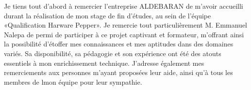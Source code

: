 Je tiens tout d’abord à remercier l’entreprise ALDEBARAN de m’avoir accueilli durant la réalisation de mon stage de fin d'études, au sein de l'équipe «Qualification Harware Pepper».
Je remercie tout particulièrement M. Emmanuel Nalepa de permi de participer à ce projet captivant et formateur, m’offrant ainsi la possibilité d'étoffer mes connaissances et mes aptitudes dans des domaines variés. Sa disponibilité, sa pédagogie et son expérience ont été des atouts essentiels à mon enrichissement technique.
J’adresse également mes remerciements aux personnes m'ayant proposées leur aide, ainsi qu'à tous les membres de lmon équipe  pour leur sympathie.